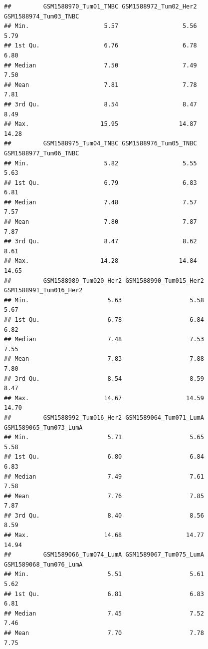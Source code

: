 \documentclass[
]{article}
\begin{document}
\begin{verbatim}
##         GSM1588970_Tum01_TNBC GSM1588972_Tum02_Her2 GSM1588974_Tum03_TNBC
## Min.                     5.57                  5.56                  5.79
## 1st Qu.                  6.76                  6.78                  6.80
## Median                   7.50                  7.49                  7.50
## Mean                     7.81                  7.78                  7.81
## 3rd Qu.                  8.54                  8.47                  8.49
## Max.                    15.95                 14.87                 14.28
##         GSM1588975_Tum04_TNBC GSM1588976_Tum05_TNBC GSM1588977_Tum06_TNBC
## Min.                     5.82                  5.55                  5.63
## 1st Qu.                  6.79                  6.83                  6.81
## Median                   7.48                  7.57                  7.57
## Mean                     7.80                  7.87                  7.87
## 3rd Qu.                  8.47                  8.62                  8.61
## Max.                    14.28                 14.84                 14.65
##         GSM1588989_Tum020_Her2 GSM1588990_Tum015_Her2 GSM1588991_Tum016_Her2
## Min.                      5.63                   5.58                   5.67
## 1st Qu.                   6.78                   6.84                   6.82
## Median                    7.48                   7.53                   7.55
## Mean                      7.83                   7.88                   7.80
## 3rd Qu.                   8.54                   8.59                   8.47
## Max.                     14.67                  14.59                  14.70
##         GSM1588992_Tum016_Her2 GSM1589064_Tum071_LumA GSM1589065_Tum073_LumA
## Min.                      5.71                   5.65                   5.58
## 1st Qu.                   6.80                   6.84                   6.83
## Median                    7.49                   7.61                   7.58
## Mean                      7.76                   7.85                   7.87
## 3rd Qu.                   8.40                   8.56                   8.59
## Max.                     14.68                  14.77                  14.94
##         GSM1589066_Tum074_LumA GSM1589067_Tum075_LumA GSM1589068_Tum076_LumA
## Min.                      5.51                   5.61                   5.62
## 1st Qu.                   6.81                   6.83                   6.81
## Median                    7.45                   7.52                   7.46
## Mean                      7.70                   7.78                   7.75

\end{verbatim}
\end{document}
